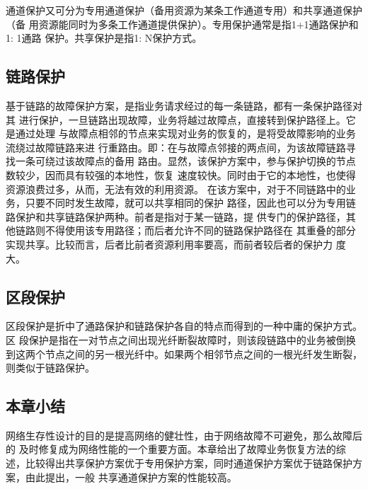 通道保护又可分为专用通道保护（备用资源为某条工作通道专用）和共享通道保护（备 用资源能同时为多条工作通道提供保护）。专用保护通常是指1+1通路保护和1: 1通路 保护。共享保护是指1: N保护方式。
\subsection{链路保护}
基于链路的故障保护方案，是指业务请求经过的每一条链路，都有一条保护路径对其 进行保护，一旦链路出现故障，业务将越过故障点，直接转到保护路径上。它是通过处理 与故障点相邻的节点来实现对业务的恢复的，是将受故障影响的业务流绕过故障链路来进 行重路由。即：在与故障点邻接的两点间，为该故障链路寻找一条可绕过该故障点的备用 路由。显然，该保护方案中，参与保护切换的节点数较少，因而具有较强的本地性，恢复 速度较快。同时由于它的本地性，也使得资源浪费过多，从而，无法有效的利用资源。
在该方案中，对于不同链路中的业务，只要不同时发生故障，就可以共享相同的保护 路径，因此也可以分为专用链路保护和共享链路保护两种。前者是指对于某一链路，提 供专门的保护路径，其他链路则不得使用该专用路径；而后者允许不同的链路保护路径在 其重叠的部分实现共享。比较而言，后者比前者资源利用率要高，而前者较后者的保护力 度大。
\subsection{区段保护}
区段保护是折中了通路保护和链路保护各自的特点而得到的一种中庸的保护方式。区 段保护是指在一对节点之间出现光纤断裂故障时，则该段链路中的业务被倒换到这两个节点之间的另一根光纤中。如果两个相邻节点之间的一根光纤发生断裂，则类似于链路保护。
\subsection{本章小结}
网络生存性设计的目的是提高网络的健壮性，由于网络故障不可避免，那么故障后的 及时修复成为网络性能的一个重要方面。本章给出了故障业务恢复方法的综述，比较得出共享保护方案优于专用保护方案，同时通道保护方案优于链路保护方案，由此提出，一般 共享通道保护方案的性能较高。



